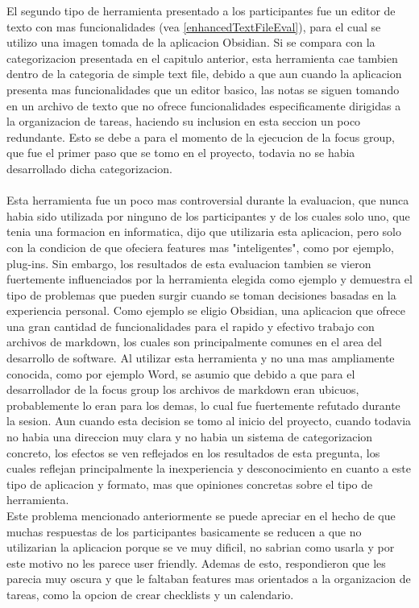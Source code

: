 El segundo tipo de herramienta presentado a los participantes fue un editor de texto con mas funcionalidades (vea \ref{enhancedTextFileEval}), para el cual se utilizo una imagen tomada de la aplicacion Obsidian. Si se compara con la categorizacion presentada en el capitulo anterior, esta herramienta cae tambien dentro de la categoria de simple text file, debido a que aun cuando la aplicacion presenta mas funcionalidades que un editor basico, las notas se siguen tomando en un archivo de texto que no ofrece funcionalidades especificamente dirigidas a la organizacion de tareas, haciendo su inclusion en esta seccion un poco redundante. Esto se debe a para el momento de la ejecucion de la focus group, que fue el primer paso que se tomo en el proyecto, todavia no se habia desarrollado dicha categorizacion.\\
\\ 
Esta herramienta fue un poco mas controversial durante la evaluacion, que nunca habia sido utilizada por ninguno de los participantes y de los cuales solo uno, que tenia una formacion en informatica, dijo que utilizaria esta aplicacion, pero solo con la condicion de que ofeciera features mas "inteligentes", como por ejemplo, plug-ins. Sin embargo, los resultados de esta evaluacion tambien se vieron fuertemente influenciados por la herramienta elegida como ejemplo y demuestra el tipo de problemas que pueden surgir cuando se toman decisiones basadas en la experiencia personal. Como ejemplo se eligio Obsidian, una aplicacion que ofrece una gran cantidad de funcionalidades para el rapido y efectivo trabajo con archivos de markdown, los cuales son principalmente comunes en el area del desarrollo de software. Al utilizar esta herramienta y no una mas ampliamente conocida, como por ejemplo Word, se asumio que debido a que para el desarrollador de la focus group los archivos de markdown eran ubicuos, probablemente lo eran para los demas, lo cual fue fuertemente refutado durante la sesion. Aun cuando esta decision se tomo al inicio del proyecto, cuando todavia no habia una direccion muy clara y no habia un sistema de categorizacion concreto, los efectos se ven reflejados en los resultados de esta pregunta, los cuales reflejan principalmente la inexperiencia y desconocimiento en cuanto a este tipo de aplicacion y formato, mas que opiniones concretas sobre el tipo de herramienta.\\
Este problema mencionado anteriormente se puede apreciar en el hecho de que muchas respuestas de los participantes basicamente se reducen a que no utilizarian la aplicacion porque se ve muy dificil, no sabrian como usarla y por este motivo no les parece user friendly. Ademas de esto, respondieron que les parecia muy oscura y que le faltaban features mas orientados a la organizacion de tareas, como la opcion de crear checklists y un calendario. \\
